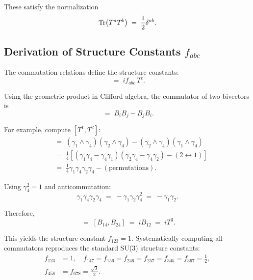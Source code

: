 \documentclass[11pt,a4paper]{article}
\theoremstyle{definition}
\theoremstyle{plain}
\theoremstyle{remark}
\begin{document}
These satisfy the normalization
\begin{equation}
\Tr(T^a T^b) \;=\; \frac{1}{2}\delta^{ab}.
\end{equation}

\subsection{Derivation of Structure Constants $f_{abc}$}

The commutation relations define the structure constants:
\begin{equation}
[T^a, T^b] \;=\; if_{abc}\,T^c.
\label{eq:commutator}
\end{equation}

Using the geometric product in Clifford algebra, the commutator of two bivectors is
\begin{equation}
[B_i, B_j] \;=\; B_i B_j - B_j B_i.
\end{equation}

For example, compute $[T^1, T^2]$:
\begin{align}
[B_{14}, B_{24}] &\;=\; (\gamma_1 \wedge \gamma_4)(\gamma_2 \wedge \gamma_4) - (\gamma_2 \wedge \gamma_4)(\gamma_1 \wedge \gamma_4) \nonumber \\
&\;=\; \frac{1}{4}[(\gamma_1\gamma_4 - \gamma_4\gamma_1)(\gamma_2\gamma_4 - \gamma_4\gamma_2) - (2 \leftrightarrow 1)] \nonumber \\
&\;=\; \frac{1}{4}\gamma_1\gamma_4\gamma_2\gamma_4 - (\text{permutations}).
\end{align}

Using $\gamma_4^2 = 1$ and anticommutation:
\begin{equation}
\gamma_1\gamma_4\gamma_2\gamma_4 \;=\; -\gamma_1\gamma_2\gamma_4^2 \;=\; -\gamma_1\gamma_2.
\end{equation}

Therefore,
\begin{equation}
[T^1, T^2] \;=\; [B_{14}, B_{24}] \;=\; i B_{12} \;=\; i T^3.
\end{equation}

This yields the structure constant $f_{123} = 1$. Systematically computing all commutators reproduces the standard SU(3) structure constants:
\begin{align}
f_{123} &= 1, \quad f_{147} = f_{156} = f_{246} = f_{257} = f_{345} = f_{367} = \frac{1}{2}, \nonumber \\
f_{458} &= f_{678} = \frac{\sqrt{3}}{2}.
\label{eq:structure-constants}
\end{align}
\end{document}
